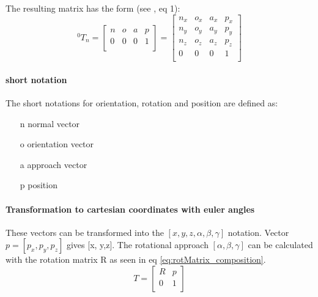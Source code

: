 The resulting matrix has the form (see \cite{invKinSolYanWu}, eq 1):
\begin{equation}\label{eq:matrixForm}
^0T_n=
\begin{bmatrix}
n & o & a & p \\
0 & 0 & 0 & 1 \\
\end{bmatrix}
=
\begin{bmatrix}
n_x & o_x & a_x & p_x \\
n_y & o_y & a_y & p_y \\ %
n_z & o_z & a_z & p_z \\
0 & 0 & 0 & 1 \\
\end{bmatrix}
\end{equation}

\paragraph{short notation}
The short notations for orientation, rotation and position are defined as:

\begin{itemize}
	\item[n] normal vector
	\item[o] orientation vector
	\item[a] approach vector
	\item[p] position
\end{itemize}


\paragraph{Transformation to cartesian coordinates with euler angles }
These vectors can be transformed into the $[x,y,z,\alpha,\beta,\gamma]$ notation.
Vector $p = [p_x, p_y, p_z] $ gives [x, y,z].
The rotational approach $[\alpha, \beta, \gamma]$ can be calculated with the rotation matrix R as seen in eq \ref{eq:rotMatrix_composition}.
\begin{equation}\label{eq:rotMatrix_composition}
T = 
\begin{bmatrix}
R & p \\
0 & 1 \\
\end{bmatrix}
\end{equation}

